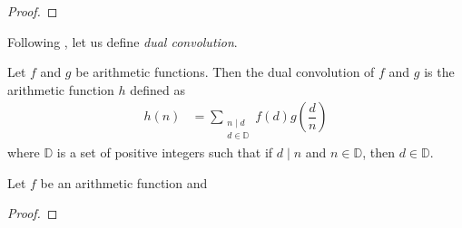 \documentclass[elemannt.tex]{subfile}
\begin{document}
		\begin{proof}
			
		\end{proof}
	Following \textcite[Page $4$, Theorem $1.2.3$]{cojocaru_murty_2006}, let us define \textit{dual convolution}.
		\begin{definition}
			Let $f$ and $g$ be arithmetic functions. Then the dual convolution of $f$ and $g$ is the arithmetic function $h$ defined as
				\begin{align*}
					h(n)
						& = \sum_{\substack{n\mid d\\d\in\mathbb{D}}}f(d)g\left(\dfrac{d}{n}\right)
				\end{align*}
			where $\mathbb{D}$ is a set of positive integers such that if $d\mid n$ and $n\in\mathbb{D}$, then $d\in\mathbb{D}$.
		\end{definition}
	
		\begin{theorem}
			Let $f$ be an arithmetic function and 
		\end{theorem}
	
		\begin{proof}
			
		\end{proof}
\end{document}
